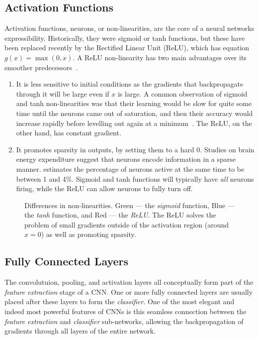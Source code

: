 \subsection{Activation Functions}\label{sec:cnn_neurons}
  Activation functions, neurons, or non-linearities, are the core of a neural networks
  expressibility. Historically, they were sigmoid or tanh functions, but these
  have been replaced recently by the Rectified Linear Unit (ReLU), which has
  equation $g(x) = \max(0,x)$. A ReLU
  non-linearity has two main advantages over its smoother predecessors~\citep{%
  glorot_deep_2011, nair_rectified_2010}.
  \begin{enumerate}
  \item It is less sensitive to initial conditions as the gradients that
    backpropagate through it will be large even if $x$ is large. A common
    observation of sigmoid and tanh non-linearities was that their learning would
    be slow for quite some time until the neurons came out of saturation, and then
    their accuracy would increase rapidly before levelling out again at
    a minimum~\citep{glorot_understanding_2010}. The ReLU, on the other hand, has
    constant gradient.
  \item It promotes sparsity in outputs, by setting them to a hard 0. Studies
    on brain energy expenditure suggest that neurons encode information in
    a sparse manner. \citet{lennie_cost_2003} estimates the percentage of
    neurons active at the same time to be between 1 and 4\%. Sigmoid and tanh
    functions will typically have \emph{all} neurons firing, while 
    the ReLU can allow neurons to fully turn off.
  \end{enumerate}

  \begin{figure}
    \centering
      \caption[Differences in non-linearities]
              {Differences in non-linearities. Green --- the \emph{sigmoid} function, 
               Blue --- the \emph{tanh} function, and Red --- the \emph{ReLU}\@. The ReLU
               solves the problem of small gradients outside of the activation
               region (around $x=0$) as well as promoting sparsity.}\label{fig:nonlinearities}
  \end{figure}

\subsection{Fully Connected Layers}\label{sec:cnn_fullyconnected}
  The convolutuion, pooling, and activation layers all
  conceptually form part of the \emph{feature extraction} stage of a CNN\@. One
  or more fully connected layers are usually placed after these layers to form
  the \emph{classifier}. One of the most elegant and indeed most powerful
  features of CNNs is this seamless connection between the \emph{feature
  extraction} and \emph{classifier} sub-networks, allowing the backpropagation
  of gradients through all layers of the entire network.

